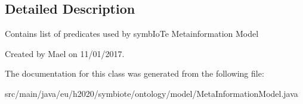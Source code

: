 \subsection{Detailed Description}
Contains list of predicates used by symb\+Io\+Te Metainformation Model

Created by Mael on 11/01/2017. 

The documentation for this class was generated from the following file\+:\begin{DoxyCompactItemize}
\item 
src/main/java/eu/h2020/symbiote/ontology/model/Meta\+Information\+Model.\+java\end{DoxyCompactItemize}

